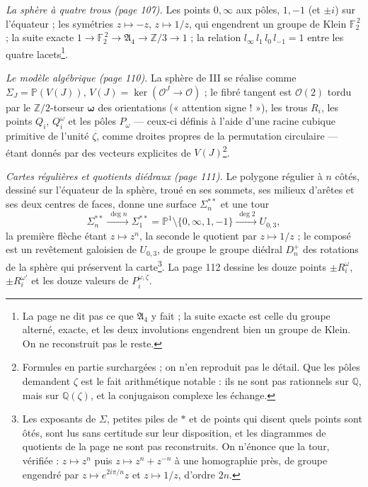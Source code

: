 \documentclass[11pt,a4paper]{article}
\begin{document}
\emph{La sphère à quatre trous (page 107).} Les points $0, \infty$ aux pôles,
$1, -1$ (et $\pm i$) sur l'équateur ; les symétries $z \mapsto -z$,
$z \mapsto 1/z$, qui engendrent un groupe de Klein $\mathbb{F}_2^{\,2}$ ; la
suite exacte $1 \to \mathbb{F}_2^{\,2} \to \mathfrak{A}_4 \to \mathbb{Z}/3 \to 1$ ;
la relation $l_\infty\, l_1\, l_0\, l_{-1} = 1$ entre les quatre lacets\footnote{La page ne dit pas ce
que $\mathfrak{A}_4$ y fait ; la suite exacte est celle du groupe alterné,
exacte, et les deux involutions engendrent bien un groupe de Klein. On ne
reconstruit pas le reste.}.

\emph{Le modèle algébrique (page 110).} La sphère de III se réalise comme
$\Sigma_J = \mathbb{P}(V(J))$, $V(J) = \ker(\mathcal{O}^J \to \mathcal{O})$ ; le
fibré tangent est $\mathcal{O}(2)$ tordu par le $\mathbb{Z}/2$-torseur
$\boldsymbol{\omega}$ des orientations (« attention signe ! »), les trous
$R_i$, les points $Q_i$, $Q_i^{\omega}$ et les pôles $P_\omega$ — ceux-ci
définis à l'aide d'une racine cubique primitive de l'unité $\zeta$, comme
droites propres de la permutation circulaire — étant donnés par des vecteurs
explicites de $V(J)$\footnote{Formules en partie surchargées ; on n'en
reproduit pas le détail. Que les pôles demandent $\zeta$ est le fait
arithmétique notable : ils ne sont pas rationnels sur $\mathbb{Q}$, mais sur
$\mathbb{Q}(\zeta)$, et la conjugaison complexe les échange.}.

\emph{Cartes régulières et quotients diédraux (page 111).} Le polygone régulier
à $n$ côtés, dessiné sur l'équateur de la sphère, troué en ses sommets, ses
milieux d'arêtes et ses deux centres de faces, donne une surface
$\Sigma_n^{**}$ et une tour
\[
\Sigma_n^{**} \xrightarrow{\ \deg n\ } \Sigma_1^{**} = \mathbb{P}^1 \setminus \{0, \infty, 1, -1\} \xrightarrow{\ \deg 2\ } U_{0,3},
\]
la première flèche étant $z \mapsto z^{n}$, la seconde le quotient par
$z \mapsto 1/z$ ; le composé est un revêtement galoisien de $U_{0,3}$, de
groupe le groupe diédral $D_n^{+}$ des rotations de la sphère qui préservent la
carte\footnote{Les exposants de $\Sigma$, petites piles de $*$ et de points
qui disent quels points sont ôtés, sont lus sans certitude sur leur
disposition, et les diagrammes de quotients de la page ne sont pas
reconstruits. On n'énonce que la tour, vérifiée : $z \mapsto z^n$ puis
$z \mapsto z^{n} + z^{-n}$ à une homographie près, de groupe engendré par
$z \mapsto e^{2i\pi/n} z$ et $z \mapsto 1/z$, d'ordre $2n$.}. La page 112
dessine les douze points $\pm R_i^{\omega}$, $\pm R_i^{\omega'}$ et les
douze valeurs de $P_i^{\omega,\zeta}$.
\end{document}
